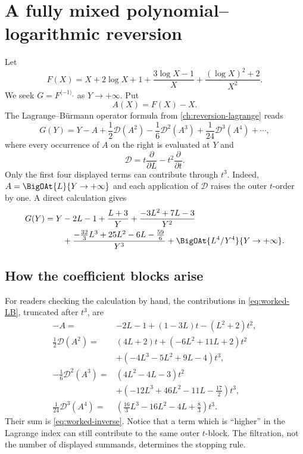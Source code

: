 \documentclass[11pt,oneside]{book}
\theoremstyle{definition}
\theoremstyle{remark}
\newcommand{\D}{\mathcal D}
\newcommand{\compinv}{^{\langle-1\rangle_{\circ}}}
\begin{document}
\section{A fully mixed polynomial--logarithmic reversion}
Let
\begin{equation}\label{eq:worked-F}
 F(X)=X+2\log X+1
 +\frac{3\log X-1}{X}
 +\frac{(\log X)^2+2}{X^2}.
\end{equation}
We seek $G=F\compinv$ as $Y\to+\infty$. Put
\[
 A(X)=F(X)-X.
\]
The Lagrange--B\"urmann operator formula from
\cref{ch:reversion-lagrange} reads
\begin{equation}\label{eq:worked-LB}
 G(Y)=Y-A+\frac12\D(A^2)-\frac16\D^2(A^3)
      +\frac1{24}\D^3(A^4)+\cdots ,
\end{equation}
where every occurrence of $A$ on the right is evaluated at $Y$ and
\[
 \D=t\frac{\partial}{\partial L}
       -t^2\frac{\partial}{\partial t}.
\]
Only the first four displayed terms can contribute through $t^3$. Indeed,
$A=\BigOAt{L}{Y\to+\infty}$ and each application of $\D$ raises the outer $t$-order by one.
A direct calculation gives
\begin{align}
 G(Y)=Y&-2L-1+\frac{L+3}{Y}
 +\frac{-3L^2+7L-3}{Y^2}\notag\\
 &+\frac{-\frac{32}{3}L^3+25L^2-6L-\frac{59}{6}}{Y^3}
 +\BigOAt{L^4/Y^4}{Y\to+\infty}.
 \label{eq:worked-inverse}
\end{align}

\subsection{How the coefficient blocks arise}
For readers checking the calculation by hand, the contributions in
\eqref{eq:worked-LB}, truncated after $t^3$, are
\begin{align*}
 -A={}&-2L-1+(1-3L)t-(L^2+2)t^2,\\
 \frac12\D(A^2)={}&(4L+2)t+(-6L^2+11L+2)t^2\\
 &+(-4L^3-5L^2+9L-4)t^3,\\
 -\frac16\D^2(A^3)={}&(4L^2-4L-3)t^2\\
 &+(-12L^3+46L^2-11L-\tfrac{17}{2})t^3,\\
 \frac1{24}\D^3(A^4)={}&
 (\tfrac{16}{3}L^3-16L^2-4L+\tfrac83)t^3.
\end{align*}
Their sum is \eqref{eq:worked-inverse}. Notice that a term which is
``higher'' in the Lagrange index can still contribute to the same outer
$t$-block. The filtration, not the number of displayed summands, determines
the stopping rule.
\end{document}
